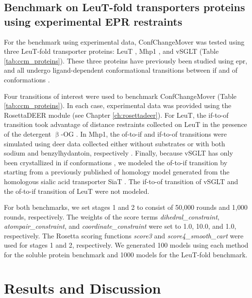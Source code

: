 \subsection{Benchmark on LeuT-fold transporters proteins using experimental EPR restraints}

For the benchmark using experimental data, ConfChangeMover was tested using three LeuT-fold transporter proteins: LeuT \citep*{Krishnamurthy2012, Yamashita2005}, Mhp1 \citep*{Shimamura2010, Weyand2008}, and vSGLT \citep*{Watanabe2010} (Table \ref{tab:ccm_proteins}). These three proteins have previously been studied using \gls{epr}, and all undergo ligand-dependent conformational transitions between \gls{if} and \gls{of} conformations \citep*{Claxton2010, Kazmier2014, Kazmier2014a, Paz2018}.

Four transitions of interest were used to benchmark ConfChangeMover (Table \ref{tab:ccm_proteins}). In each case, experimental data was provided using the RosettaDEER module (see Chapter \ref{ch:rosettadeer}). For LeuT, the \gls{if}-to-\gls{of} transition took advantage of distance restraints collected on LeuT in the presence of the detergent $\mathrm{\upbeta}$-OG \citep*{Kazmier2014a}. In Mhp1, the \gls{of}-to-\gls{if} and \gls{if}-to-\gls{of} transitions were simulated using \gls{deer} data collected either without substrates or with both sodium and benzylhydantoin, respectively \citep*{Kazmier2014}. Finally, because vSGLT has only been crystallized in \gls{if} conformations \citep*{Faham2008, Watanabe2010}, we modeled the \gls{of}-to-\gls{if} transition by starting from a previously published \gls{of} homology model generated from the homologous sialic acid transporter SiaT \citep*{Paz2018, Wahlgren2018}. The \gls{if}-to-\gls{of} transition of vSGLT and the \gls{of}-to-\gls{if} transition of LeuT were not modeled.

For both benchmarks, we set stages 1 and 2 to consist of 50,000 rounds and 1,000 rounds, respectively. The weights of the score terms \emph{dihedral\_constraint}, \emph{atompair\_constraint}, and \emph{coordinate\_constraint} were set to 1.0, 10.0, and 1.0, respectively. The Rosetta scoring functions \emph{score3} and \emph{score4\_smooth\_cart} were used for stages 1 and 2, respectively. We generated 100 models using each method for the soluble protein benchmark and 1000 models for the LeuT-fold benchmark. 

\section{Results and Discussion}

